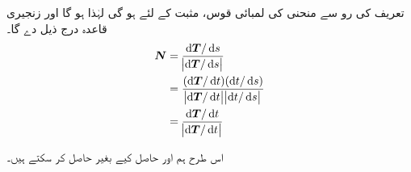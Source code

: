  تعریف کی رو سے  منحنی   کی لمبائی قوس،   مثبت  کے لئے ہو گی لہٰذا  ہو گا   اور زنجیری قاعدہ درج ذیل دے گا۔
\begin{align}
\kvec{N}&=\frac{\dif\kvec{T}/\dif s}{\abs{\dif\kvec{T}/\dif s}}\nonumber\\
&=\frac{(\dif\kvec{T}/\dif t)(\dif t/\dif s)}{\abs{\dif\kvec{T}/\dif t}\abs{\dif t/\dif s}}\nonumber\\
&=\frac{\dif\kvec{T}/\dif t}{\abs{\dif\kvec{T}/\dif t}}
\end{align}

اس طرح ہم  اور  حاصل کیے بغیر  حاصل کر سکتے ہیں۔



